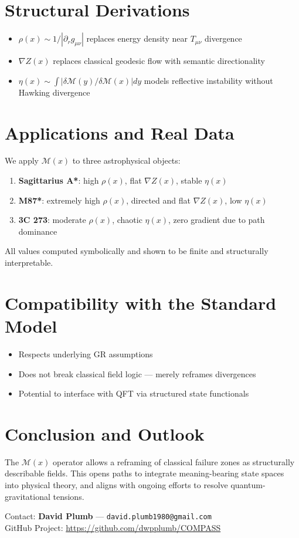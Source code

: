 \documentclass[11pt]{article}
\begin{document}
\section{Structural Derivations}
\begin{itemize}
  \item $\rho(x) \sim 1/|\partial_r g_{\mu\nu}|$ replaces energy density near $T_{\mu\nu}$ divergence
  \item $\nabla Z(x)$ replaces classical geodesic flow with semantic directionality
  \item $\eta(x) \sim \int |\delta \mathcal{M}(y)/\delta \mathcal{M}(x)| dy$ models reflective instability without Hawking divergence
\end{itemize}

\section{Applications and Real Data}
We apply $\mathcal{M}(x)$ to three astrophysical objects:
\begin{enumerate}
  \item \textbf{Sagittarius A*}: high $\rho(x)$, flat $\nabla Z(x)$, stable $\eta(x)$
  \item \textbf{M87*}: extremely high $\rho(x)$, directed and flat $\nabla Z(x)$, low $\eta(x)$
  \item \textbf{3C 273}: moderate $\rho(x)$, chaotic $\eta(x)$, zero gradient due to path dominance
\end{enumerate}
All values computed symbolically and shown to be finite and structurally interpretable.

\section{Compatibility with the Standard Model}
\begin{itemize}
  \item Respects underlying GR assumptions
  \item Does not break classical field logic — merely reframes divergences
  \item Potential to interface with QFT via structured state functionals
\end{itemize}

\section{Conclusion and Outlook}
The $\mathcal{M}(x)$ operator allows a reframing of classical failure zones as structurally describable fields. This opens paths to integrate meaning-bearing state spaces into physical theory, and aligns with ongoing efforts to resolve quantum-gravitational tensions.

\bigskip
\noindent
Contact: \textbf{David Plumb} — \texttt{david.plumb1980@gmail.com} \\
GitHub Project: \url{https://github.com/dwpplumb/COMPASS}
\end{document}
